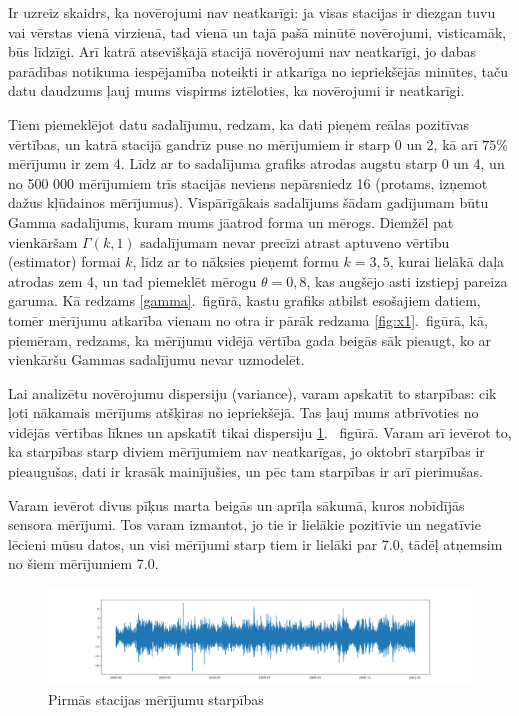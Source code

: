 \documentclass[12pt,a4paper]{article}
\begin{document}
Ir uzreiz skaidrs, ka novērojumi nav neatkarīgi: ja visas stacijas ir diezgan tuvu vai vērstas vienā virzienā, tad vienā un tajā pašā minūtē novērojumi, visticamāk, būs līdzīgi. Arī katrā atsevišķajā stacijā novērojumi nav neatkarīgi, jo dabas parādības notikuma iespējamība noteikti ir atkarīga no iepriekšējās minūtes, taču datu daudzums ļauj mums vispirms iztēloties, ka novērojumi ir neatkarīgi.

Tiem piemeklējot datu sadalījumu, redzam, ka dati pieņem reālas pozitīvas vērtības, un katrā stacijā gandrīz puse no mērījumiem ir starp 0 un 2, kā arī \(75\%\) mērījumu ir zem 4. Līdz ar to sadalījuma grafiks atrodas augstu starp 0 un 4, un no 500 000 mērījumiem trīs stacijās neviens nepārsniedz 16 (protams, izņemot dažus kļūdainos mērījumus). Vispārīgākais sadalījums šādam gadījumam būtu Gamma sadalījums, kuram mums jāatrod forma un mērogs. 
Diemžēl pat vienkāršam \(\Gamma(k, 1)\) sadalījumam nevar precīzi atrast aptuveno vērtību (estimator) formai \(k\), līdz ar to nāksies pieņemt formu \(k=3,5\), kurai lielākā daļa atrodas zem 4, un tad piemeklēt mērogu \(\theta=0,8\), kas augšējo asti izstiepj pareiza garuma. Kā redzams \ref{gamma}.~figūrā, kastu grafiks atbilst esošajiem datiem, tomēr mērījumu atkarība vienam no otra ir pārāk redzama \ref{fig:x1}.~figūrā, kā, piemēram, redzams, ka mērījumu vidējā vērtība gada beigās sāk pieaugt, ko ar vienkāršu Gammas sadalījumu nevar uzmodelēt.

Lai analizētu novērojumu dispersiju (variance), varam apskatīt to starpības: cik ļoti nākamais mērījums atšķiras no iepriekšējā. Tas ļauj mums atbrīvoties no vidējās vērtības līknes un apskatīt tikai dispersiju \ref{fig:starpibas}.~ figūrā. 
Varam arī ievērot to, ka starpības starp diviem mērījumiem nav neatkarīgas, jo oktobrī starpības ir pieaugušas, dati ir krasāk mainījušies, un pēc tam starpības ir arī pierimušas.

Varam ievērot divus pīķus marta beigās un aprīļa sākumā, kuros nobīdījās sensora mērījumi. Tos varam izmantot, jo tie ir lielākie pozitīvie un negatīvie lēcieni mūsu datos, un visi mērījumi starp tiem ir lielāki par 7.0, tādēļ atņemsim no šiem mērījumiem 7.0.

\begin{figure}[ht!]
    \centering
    \includegraphics[width=14cm]{starpibas.png}
    \caption{Pirmās stacijas mērījumu starpības}\label{fig:starpibas}
\end{figure}
\end{document}
